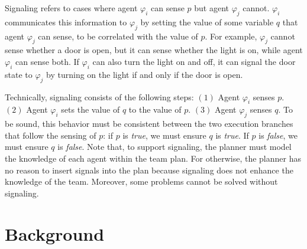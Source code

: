 \documentclass[letterpaper]{article}
\theoremstyle{definition}
\begin{document}
Signaling refers to cases where agent $\varphi_i$ can sense $p$ but agent $\varphi_j$ cannot.
$\varphi_i$  communicates this information to $\varphi_j$ by setting the value of some variable $q$ that agent $\varphi_j$ can sense, to be correlated with the value of $p$. For example,  $\varphi_j$ cannot sense whether a door is open, but it can sense whether the light is on, while agent $\varphi_i$ can sense both. If $\varphi_i$ can also turn the light on and off, it can signal the door state to $\varphi_j$ by turning on the light if and only if the door is open.



Technically, signaling consists of the following steps: $(1)$ Agent $\varphi_i$ senses $p$. $(2)$ Agent $\varphi_i$ sets the value of $q$ to the value of $p$. $(3)$ Agent $\varphi_j$ senses $q$.
To be sound, this behavior must be consistent between the two execution branches that follow the sensing of $p$: if $p$ is \emph{true}, we must ensure $q$ is \emph{true}.
If $p$ is \emph{false}, we must ensure $q$ is \emph{false}.
Note that, to support signaling, the planner must model the knowledge of each agent within the team plan. For otherwise, the planner has no reason to insert signals into the plan because signaling does not enhance the knowledge of the team. Moreover, some problems cannot be solved without signaling.













\section{Background}
\end{document}
